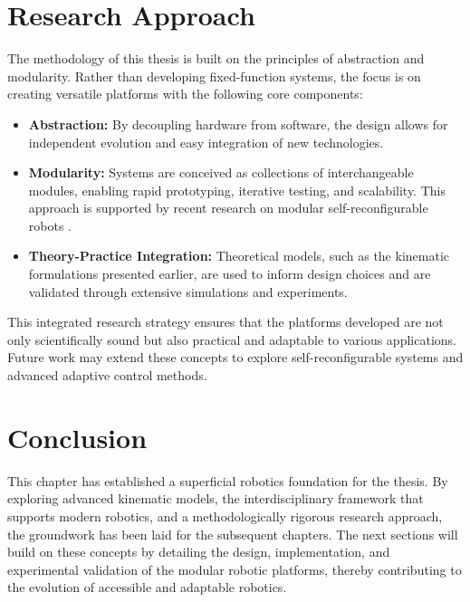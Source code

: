 \section{Research Approach}
The methodology of this thesis is built on the principles of abstraction and modularity. Rather than developing fixed-function systems, the focus is on creating versatile platforms with the following core components:
\begin{itemize}
    \item \textbf{Abstraction:} By decoupling hardware from software, the design allows for independent evolution and easy integration of new technologies.
    \item \textbf{Modularity:} Systems are conceived as collections of interchangeable modules, enabling rapid prototyping, iterative testing, and scalability. This approach is supported by recent research on modular self-reconfigurable robots \cite{Yim2007}.
    \item \textbf{Theory-Practice Integration:} Theoretical models, such as the kinematic formulations presented earlier, are used to inform design choices and are validated through extensive simulations and experiments.
\end{itemize}

This integrated research strategy ensures that the platforms developed are not only scientifically sound but also practical and adaptable to various applications. Future work may extend these concepts to explore self-reconfigurable systems and advanced adaptive control methods.

\section{Conclusion}
This chapter has established a superficial robotics foundation for the thesis. By exploring advanced kinematic models, the interdisciplinary framework that supports modern robotics, and a methodologically rigorous research approach, the groundwork has been laid for the subsequent chapters. The next sections will build on these concepts by detailing the design, implementation, and experimental validation of the modular robotic platforms, thereby contributing to the evolution of accessible and adaptable robotics.

